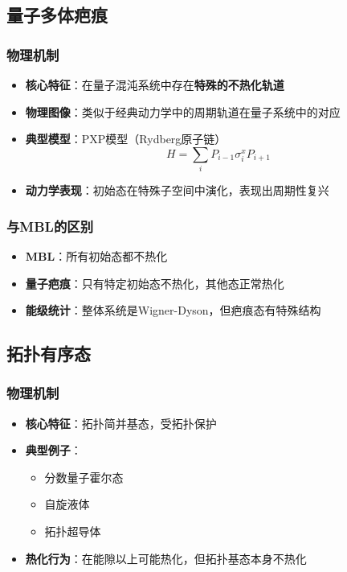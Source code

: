 \documentclass[11pt,a4paper]{article}
\begin{document}
\subsection{量子多体疤痕}

\subsubsection{物理机制}
\begin{itemize}
    \item \textbf{核心特征}：在量子混沌系统中存在\textbf{特殊的不热化轨道}
    \item \textbf{物理图像}：类似于经典动力学中的周期轨道在量子系统中的对应
    \item \textbf{典型模型}：PXP模型（Rydberg原子链）
    \[
    H = \sum_i P_{i-1} \sigma^x_i P_{i+1}
    \]
    \item \textbf{动力学表现}：初始态在特殊子空间中演化，表现出周期性复兴
\end{itemize}

\subsubsection{与MBL的区别}
\begin{itemize}
    \item \textbf{MBL}：所有初始态都不热化
    \item \textbf{量子疤痕}：只有特定初始态不热化，其他态正常热化
    \item \textbf{能级统计}：整体系统是Wigner-Dyson，但疤痕态有特殊结构
\end{itemize}

\subsection{拓扑有序态}

\subsubsection{物理机制}
\begin{itemize}
    \item \textbf{核心特征}：拓扑简并基态，受拓扑保护
    \item \textbf{典型例子}：
    \begin{itemize}
        \item 分数量子霍尔态
        \item 自旋液体
        \item 拓扑超导体
    \end{itemize}
    \item \textbf{热化行为}：在能隙以上可能热化，但拓扑基态本身不热化
\end{itemize}
\end{document}

